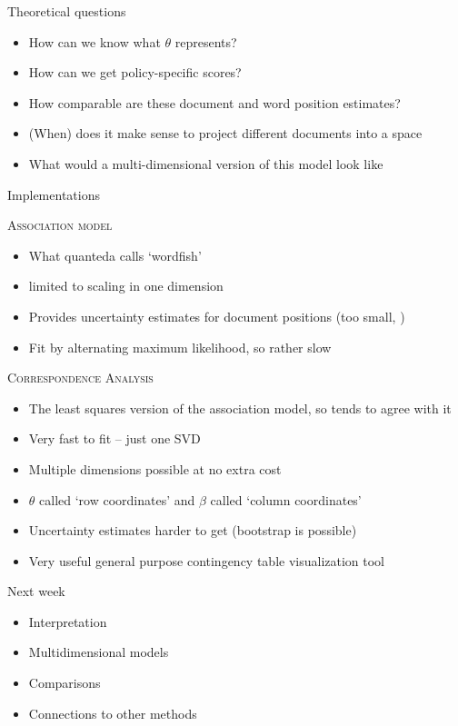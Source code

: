 \documentclass{hertieteaching}
\begin{document}
\begin{frame}{Theoretical questions}

\begin{itemize}
  \item How can we know what $\theta$ represents?
  \item How can we get policy-specific scores?
  \item How comparable are these document and word position estimates?
  \item (When) does it make sense to project different documents into a space
  \item What would a multi-dimensional version of this model look like
\end{itemize}

\end{frame}

\begin{frame}{Implementations}

\textsc{Association model}
\begin{itemize}
  \item What quanteda calls `wordfish'
  \item limited to scaling in one dimension
  \item Provides uncertainty estimates for document positions (too small, \cite{Lowe.Benoit2013})
  \item Fit by alternating maximum likelihood, so rather slow
\end{itemize}

\textsc{Correspondence Analysis}
\begin{itemize}
  \item The least squares version of the association model, so tends to agree with it
  \item Very fast to fit -- just one SVD
  \item Multiple dimensions possible at no extra cost
  \item $\theta$ called `row coordinates' and $\beta$ called `column coordinates'
  \item Uncertainty estimates harder to get (bootstrap is possible)
  \item Very useful general purpose contingency table visualization tool\end{itemize}
\end{frame}

\begin{frame}{Next week}
\begin{itemize}
  \item Interpretation
  \item Multidimensional models
  \item Comparisons 
  \item Connections to other methods
\end{itemize}

\end{frame}
\end{document}
